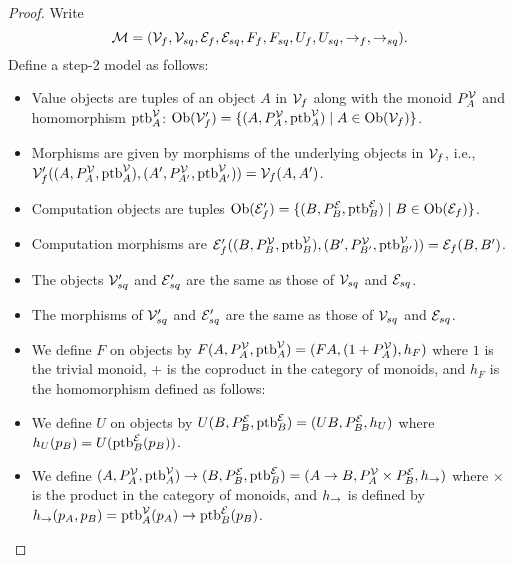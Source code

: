 \begin{proof}
    Write 
    \[ \mathcal M = (\mathcal{V}_f, \mathcal{V}_{sq}, \mathcal{E}_f, \mathcal{E}_{sq}, F_f, F_{sq}, U_f, U_{sq}, \to_f, \to_{sq}). \] 
    Define a step-2 model as follows:
    \begin{itemize}
      \item Value objects are tuples of an object $A$ in $\mathcal{V}_f$ along with the monoid
      $P^{\mathcal{V}}_A$ and homomorphism $\text{ptb}^\mathcal{V}_A$:
      $\text{Ob}(\mathcal{V}_f') = \{ (A, P^{\mathcal{V}}_A, \text{ptb}^\mathcal{V}_A) \mid A \in \text{Ob}(\mathcal{V}_f) \}$.
      
      \item Morphisms are given by morphisms of the underlying objects in $\mathcal{V}_f$, i.e.,
       $\mathcal{V}_f'((A, P^{\mathcal{V}}_A, \text{ptb}^\mathcal{V}_A), (A', P^{\mathcal{V}}_{A'}, \text{ptb}^\mathcal{V}_{A'})) = \mathcal{V}_f(A, A')$.
      
      \item Computation objects are tuples 
      $\text{Ob}(\mathcal{E}_f') = \{ (B, P^{\mathcal{E}}_B, \text{ptb}^\mathcal{E}_B) \mid B \in \text{Ob}(\mathcal{E}_f) \}$.
      
      \item Computation morphisms are $\mathcal{E}_f'((B, P^{\mathcal{V}}_B, \text{ptb}^\mathcal{V}_B), (B', P^{\mathcal{V}}_{B'}, \text{ptb}^\mathcal{V}_{B'})) = \mathcal{E}_f(B, B')$.
      
      \item The objects $\mathcal{V}_{sq}'$ and $\mathcal{E}_{sq}'$ are the same as those of $\mathcal{V}_{sq}$ and $\mathcal{E}_{sq}$.
      
      \item The morphisms of $\mathcal{V}_{sq}'$ and $\mathcal{E}_{sq}'$ are the same as those of $\mathcal{V}_{sq}$ and $\mathcal{E}_{sq}$.
      
      \item We define $F$ on objects by $F (A, P^{\mathcal{V}}_A, \text{ptb}^\mathcal{V}_A) = (FA, (1 + P^{\mathcal{V}}_A), h_F)$
      where $1$ is the trivial monoid, $+$ is the coproduct in the category of monoids, and $h_F$ is the homomorphism defined as follows:

      \item We define $U$ on objects by $U (B, P^{\mathcal{E}}_B, \text{ptb}^\mathcal{E}_B) = (UB, P^{\mathcal{E}}_B, h_U)$
      where $h_U(p_B) = U(\text{ptb}^\mathcal{E}_B(p_B))$.
      
      \item We define $(A, P^{\mathcal{V}}_A, \text{ptb}^\mathcal{V}_A) \to (B, P^{\mathcal{E}}_B, \text{ptb}^\mathcal{E}_B) = (A \to B, P^{\mathcal{V}}_A \times P^{\mathcal{E}}_B, h_\to)$
      where $\times$ is the product in the category of monoids, and $h_\to$ is defined by 
      $h_\to(p_A, p_B) = \text{ptb}^\mathcal{V}_A(p_A) \to \text{ptb}^\mathcal{E}_B(p_B)$.
    \end{itemize}
\end{proof}

